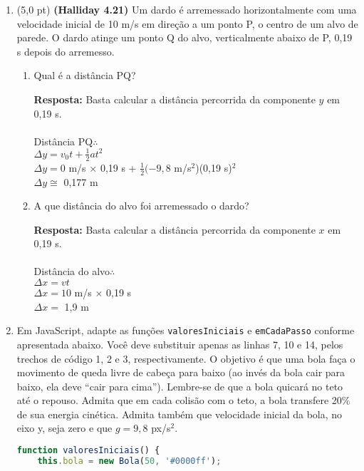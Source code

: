 \documentclass[12pt,a4paper,oneside]{article}
\begin{document}
\begin{enumerate}

	\item (5,0 pt) {\bf (Halliday 4.21)} Um dardo é arremessado horizontalmente com uma velocidade inicial de 10 m/s em direção a um ponto P, o centro de um alvo de parede. O dardo atinge um ponto Q do alvo, verticalmente abaixo de P, 0,19 s depois do arremesso. \label{q:dardo}
	\begin{enumerate}
		\item Qual é a distância PQ?
		
		{\color{blue} {\bf Resposta:} Basta calcular a distância percorrida da componente $y$ em 0,19 s.\\
			\\
			Distância PQ$\therefore$ \\
			$\Delta y = v_0t + \frac{1}{2}at^2$\\
			$\Delta y = 0$ m/s $\times$ 0,19 s + $\frac{1}{2}(-9,8$ m/s$^2$)(0,19 s)$^2$\\
			$\Delta y \cong$ 0,177 m
		}
		\item A que distância do alvo foi arremessado o dardo?
		
			{\color{blue} {\bf Resposta:} Basta calcular a distância percorrida da componente $x$ em 0,19 s.\\
				\\
				Distância do alvo$\therefore$ \\
				$\Delta x = vt$\\
				$\Delta x = 10$ m/s $\times$ 0,19 s\\
				$\Delta x =$ 1,9 m
			}
	\end{enumerate}

\newpage

	\item Em JavaScript, adapte as funções {\tt valoresIniciais} e {\tt emCadaPasso} conforme apresentada abaixo. Você deve substituir apenas as linhas 7, 10 e 14, pelos trechos de código 1, 2 e 3, respectivamente. O objetivo é que uma bola faça o movimento de queda livre de cabeça para baixo (ao invés da bola cair para baixo, ela deve ``cair para cima''). Lembre-se de que a bola quicará no teto até o repouso. Admita que em cada colisão com o teto, a bola transfere 20\% de sua energia cinética. Admita também que velocidade inicial da bola, no eixo y, seja zero e que $g = 9,8$ px/s$^2$.
	
	\begin{lstlisting}[language=JavaScript]
function valoresIniciais() {
	this.bola = new Bola(50, '#0000ff');
	

\end{lstlisting}
\end{enumerate}
\end{document}
